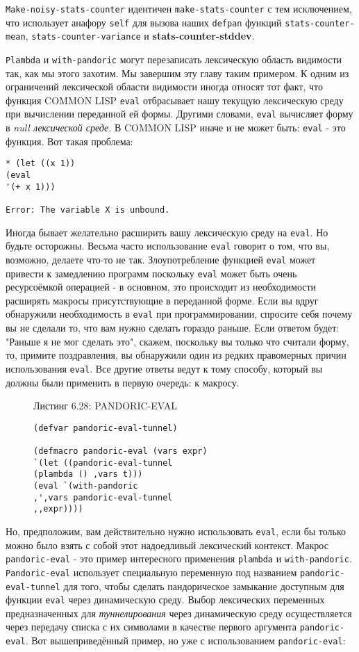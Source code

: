 \verb"Make-noisy-stats-counter" идентичен \verb"make-stats-counter" с тем исключением, что использует анафору \verb"self" для вызова наших \verb"defpan" функций \verb"stats-counter-mean", \verb"stats-counter-variance" и {\Eng\textbf{stats\--\-coun\-ter\--\-std\-dev}}.

\verb"Plambda" и \verb"with-pandoric" могут перезаписать лексическую область видимости так, как мы этого захотим. Мы завершим эту главу таким примером. К одним из ограничений лексической области видимости иногда относят тот факт, что функция COMMON LISP \verb"eval" отбрасывает нашу текущую лексическую среду при вычислении переданной ей формы. Другими словами, \verb"eval" вычисляет форму в \emph{null лексической среде}. В COMMON LISP иначе и не может быть: \verb"eval" - это функция. Вот такая проблема:

\begin{verbatim}
* (let ((x 1))
(eval
'(+ x 1)))

Error: The variable X is unbound.
\end{verbatim}

Иногда бывает желательно расширить вашу лексическую среду на \verb"eval". Но будьте осторожны. Весьма часто использование \verb"eval" говорит о том, что вы, возможно, делаете что-то не так. Злоупотребление функцией \verb"eval" может привести к замедлению программ поскольку \verb"eval" может быть очень ресурсоёмкой операцией - в основном, это происходит из необходимости расширять макросы присутствующие в переданной форме. Если вы вдруг обнаружили необходимость в \verb"eval" при программировании, спросите себя почему вы не сделали то, что вам нужно сделать гораздо раньше. Если ответом будет: "Раньше я не мог сделать это", скажем, поскольку вы только что считали форму, то, примите поздравления, вы обнаружили один из редких правомерных причин использования \verb"eval". Все другие ответы ведут к тому способу, который вы должны были применить в первую очередь: к макросу.

\begin{figure}Листинг 6.28: PANDORIC-EVAL\label{listing_6.28}
\listbegin
\begin{verbatim}
(defvar pandoric-eval-tunnel)

(defmacro pandoric-eval (vars expr)
`(let ((pandoric-eval-tunnel
(plambda () ,vars t)))
(eval `(with-pandoric
,',vars pandoric-eval-tunnel
,,expr))))
\end{verbatim}
\listend
\end{figure}

Но, предположим, вам действительно нужно использовать \verb"eval", если бы только можно было взять с собой этот надоедливый лексический контекст. Макрос \verb"pandoric-eval" - это пример интересного применения \verb"plambda" и \verb"with-pandoric". \verb"Pandoric-eval" использует специальную переменную под названием \verb"pandoric-eval-tunnel" для того, чтобы сделать пандорическое замыкание доступным для функции \verb"eval" через динамическую среду. Выбор лексических переменных предназначенных для \emph{туннелирования} через динамическую среду осуществляется через передачу списка с их символами в качестве первого аргумента \verb"pandoric-eval". Вот вышеприведённый пример, но уже с использованием \verb"pandoric-eval":


